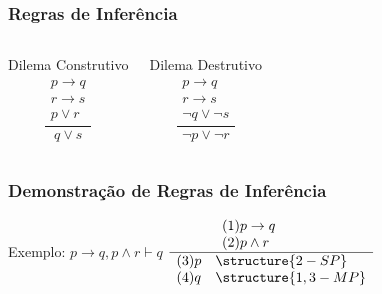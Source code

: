 \documentclass{beamer}
\begin{document}
\begin{frame}
\frametitle{Regras de Inferência}

\begin{columns}[c]
	\large
	\begin{block}{Dilema Construtivo}
		\large
		\begin{equation*}
		\frac{\begin{array}{l} p \rightarrow q \\ r \rightarrow s \\ p \vee r \end{array}}{q \vee s}
		\end{equation*}
	\end{block}	
	
	\begin{block}{Dilema Destrutivo}
		\large
		\begin{equation*}
		\frac{\begin{array}{l} p \rightarrow q \\ r \rightarrow s \\ \neg q \vee \neg s \end{array}}{\neg p \vee \neg r}
		\end{equation*}
	\end{block}	
\end{columns}
\end{frame}

\begin{frame}
\frametitle{Demonstração de Regras de Inferência}

	\begin{exampleblock}{Exemplo: $p \rightarrow q, p \wedge r  \vdash q$}
		\large
		$\frac{\begin{array}{ll} (1) p \rightarrow q & ~~~~\\ (2) p \wedge r ~~~~\end{array}}{\begin{array}{ll} (3) p & \structure{2 - SP}   \\ (4) q & \structure{1,3 - MP}\end{array}}$
	\end{exampleblock}
\end{frame}
\end{document}
